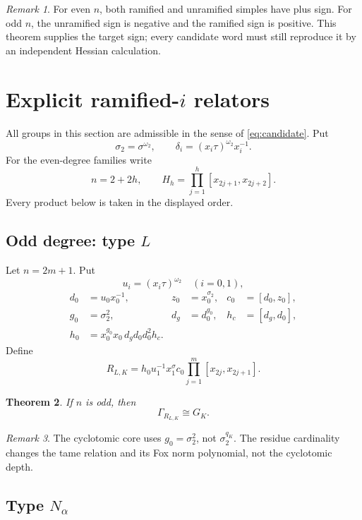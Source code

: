 \documentclass[11pt,reqno]{amsart}
\newtheorem{theorem}{Theorem}[section]
\theoremstyle{definition}
\theoremstyle{remark}
\newtheorem{remark}[theorem]{Remark}
\numberwithin{equation}{section}
\begin{document}
\begin{remark}
For even \(n\), both ramified and unramified simples have plus sign.
For odd \(n\), the unramified sign is negative and the ramified sign is
positive.  This theorem supplies the target sign; every candidate word
must still reproduce it by an independent Hessian calculation.
\end{remark}

\section{Explicit \texorpdfstring{ramified-\(i\)}{ramified-i} relators}
\label{sec:relators}

All groups in this section are admissible in the sense of
\eqref{eq:candidate}.  Put
\[
 \sigma_2=\sigma^{\omega_2},\qquad
 \delta_i=(x_i\tau)^{\omega_2}x_i^{-1}.
\]
For the even-degree families write
\[
 n=2+2h,\qquad
 H_h=\prod_{j=1}^{h}[x_{2j+1},x_{2j+2}].
\]
Every product below is taken in the displayed order.

\subsection{Odd degree: type \texorpdfstring{\(L\)}{L}}

Let \(n=2m+1\).  Put
\[
 u_i=(x_i\tau)^{\omega_2}\quad(i=0,1),
\]
\[
\begin{aligned}
 d_0&=u_0x_0^{-1},&
 z_0&=x_0^{\sigma_2},&
 c_0&=[d_0,z_0],\\
 g_0&=\sigma_2^2,&
 d_g&=d_0^{g_0},&
 h_c&=[d_g,d_0],\\
 h_0&=x_0^{g_0}x_0\,d_gd_0d_0^2h_c.
\end{aligned}
\]
Define
\begin{equation}\label{eq:Lword}
 R_{L,K}
 =h_0u_1^{-1}x_1^\sigma c_0
  \prod_{j=1}^{m}[x_{2j},x_{2j+1}].
\end{equation}

\begin{theorem}\label{thm:Lword}
If \(n\) is odd, then
\[
 \Gamma_{R_{L,K}}\cong G_K.
\]
\end{theorem}

\begin{remark}
The cyclotomic core uses \(g_0=\sigma_2^2\), not
\(\sigma_2^{q_K}\).  The residue cardinality changes the tame relation
and its Fox norm polynomial, not the cyclotomic depth.
\end{remark}

\subsection{Type \texorpdfstring{\(N_\alpha\)}{N-alpha}}
\end{document}
